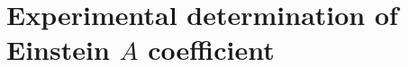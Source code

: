 \documentclass[%
 amsmath,amssymb,
aps,
]{revtex4-2}
\begin{document}
 
\section{Experimental determination of Einstein \(A\) coefficient}


\end{document}
